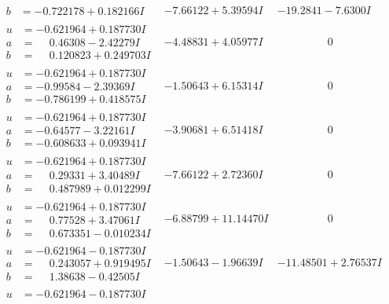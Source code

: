 \documentclass[1p]{elsarticle_modified}
\theoremstyle{definition}
\begin{document}
$$\begin{array}{c|c|c}
\begin{aligned}
b &= -0.722178 + 0.182166 I\end{aligned}
 & -7.66122 + 5.39594 I & -19.2841 - 7.6300 I \\ \hline\begin{aligned}
u &= -0.621964 + 0.187730 I \\
a &= \phantom{-}0.46308 - 2.42279 I \\
b &= \phantom{-}0.120823 + 0.249703 I\end{aligned}
 & -4.48831 + 4.05977 I & \phantom{-0.000000 } 0 \\ \hline\begin{aligned}
u &= -0.621964 + 0.187730 I \\
a &= -0.99584 - 2.39369 I \\
b &= -0.786199 + 0.418575 I\end{aligned}
 & -1.50643 + 6.15314 I & \phantom{-0.000000 } 0 \\ \hline\begin{aligned}
u &= -0.621964 + 0.187730 I \\
a &= -0.64577 - 3.22161 I \\
b &= -0.608633 + 0.093941 I\end{aligned}
 & -3.90681 + 6.51418 I & \phantom{-0.000000 } 0 \\ \hline\begin{aligned}
u &= -0.621964 + 0.187730 I \\
a &= \phantom{-}0.29331 + 3.40489 I \\
b &= \phantom{-}0.487989 + 0.012299 I\end{aligned}
 & -7.66122 + 2.72360 I & \phantom{-0.000000 } 0 \\ \hline\begin{aligned}
u &= -0.621964 + 0.187730 I \\
a &= \phantom{-}0.77528 + 3.47061 I \\
b &= \phantom{-}0.673351 - 0.010234 I\end{aligned}
 & -6.88799 + 11.14470 I & \phantom{-0.000000 } 0 \\ \hline\begin{aligned}
u &= -0.621964 - 0.187730 I \\
a &= \phantom{-}0.243057 + 0.919495 I \\
b &= \phantom{-}1.38638 - 0.42505 I\end{aligned}
 & -1.50643 - 1.96639 I & -11.48501 + 2.76537 I \\ \hline\begin{aligned}
u &= -0.621964 - 0.187730 I \\

\end{aligned}
\end{array}$$
\end{document}
